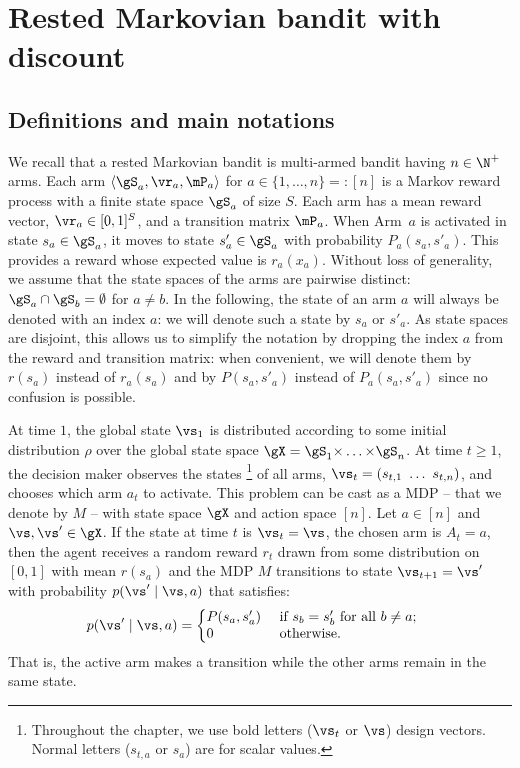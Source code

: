 \section{Rested Markovian bandit with discount}
\label{sec:bandits}


\subsection{Definitions and main notations}
\label{ssec:def}

We recall that a rested Markovian bandit is multi-armed bandit having $n\in\N^+$ arms. Each arm $\langle\gS_a,\vr_a,\mP_a\rangle$ for $a\in\{1,\dots, n\}=:[n]$ is a Markov
reward process with a finite state space $\gS_a$ of size $S$. Each arm has
a mean reward vector, $\vr_a\in[0,1]^S$, and a transition matrix
$\mP_a$. When Arm~$a$ is activated in state $s_a\in\gS_a$, it moves to
state $s'_a\in\gS_a$ with probability $P_a(s_a,s'_a)$. This provides a reward
whose expected value is $r_a(x_a)$. Without loss of generality, we assume
that the state spaces of the arms are pairwise distinct:
$\gS_a\cap\gS_b=\emptyset$ for $a\ne b$.  In the following, the state of an
arm $a$ will always be denoted with an index $a$: we will denote such a
state by $s_a$ or $s'_a$. As state spaces are disjoint, this allows us to
simplify the notation by dropping the index $a$ from the reward and transition
matrix: when convenient, we will denote them by $r(s_a)$ instead of $r_a(s_a)$
and by $P(s_a,s'_a)$ instead of $P_a(s_a,s'_a)$ since no confusion is possible. 

At time $1$, the global  state $\vs_1$ is distributed according to some initial
distribution $\rho$ over the global state space $\gX =
\gS_1{\times}\dots{\times}\gS_n$. At time $t\ge 1$, the decision maker observes
the states
\footnote{Throughout the chapter, we use bold letters ($\vs_t$ or $\vs$) design vectors. Normal letters
($s_{t,a}$ or $s_a$) are for scalar values.} of all arms,
$\vs_t=(s_{t,1}\ \dots\ s_{t,n})$, and chooses which arm $a_t$ to activate.
This problem can be cast as a MDP -- that we denote by $M$ -- with state
space $\gX$ and action space \([n]\). Let $a\in[n]$ and $\vs,\vs'\in\gX$. If the
state at time $t$ is $\vs_t=\vs$, the chosen arm is $A_t=a$, then the agent
receives a random reward $r_t$ drawn from some distribution on \([0,1]\) with
mean \(r(s_a)\) and the MDP $M$ transitions to state $\vs_{t+1}=\vs'$ with
probability \(p(\vs'\mid \vs,a)\) that satisfies:
\begin{align}
    \label{eq:defP}
    p(\vs' \mid \vs,a) 
    &= 
    \left\{
        \begin{array}{@{}ll@{}}
            P(s_a,s'_a) & \text{ if $s_{b}=s'_{b}$ for all $b\ne a$;}\\
            0 &\text{ otherwise}.
        \end{array}
    \right.
\end{align}
That is, the active arm makes a transition while the other arms remain in
the same state.

